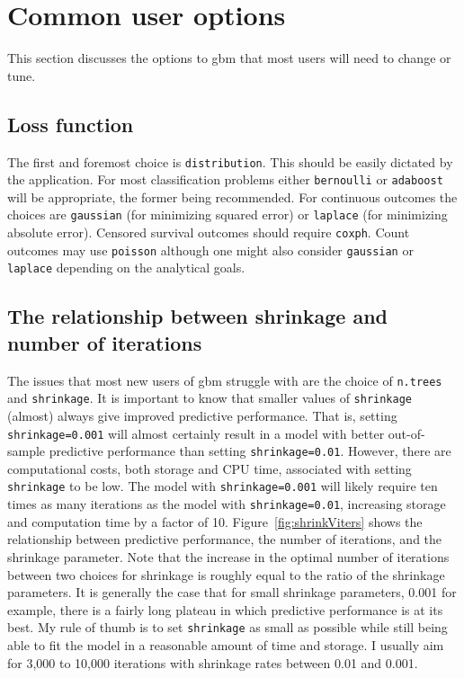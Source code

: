 \documentclass{article}
\begin{document}
\section{Common user options}

This section discusses the options to gbm that most users will need to change or tune.

\subsection{Loss function}
The first and foremost choice is \texttt{distribution}. This should be easily dictated by the application. For most classification problems either \texttt{bernoulli} or \texttt{adaboost} will be appropriate, the former being recommended. For continuous outcomes the choices are \texttt{gaussian} (for minimizing squared error) or \texttt{laplace} (for minimizing absolute error). Censored survival outcomes should require \texttt{coxph}. Count outcomes may use \texttt{poisson} although one might also consider \texttt{gaussian} or \texttt{laplace} depending on the analytical goals.

\subsection{The relationship between shrinkage and number of iterations}
The issues that most new users of gbm struggle with are the choice of \texttt{n.trees} and \texttt{shrinkage}. It is important to know that smaller values of \texttt{shrinkage} (almost) always give improved predictive performance. That is, setting \texttt{shrinkage=0.001} will almost certainly result in a model with better out-of-sample predictive performance than setting \texttt{shrinkage=0.01}. However, there are computational costs, both storage and CPU time, associated with setting \texttt{shrinkage} to be low. The model with \texttt{shrinkage=0.001} will likely require ten times as many iterations as the model with \texttt{shrinkage=0.01}, increasing storage and computation time by a factor of 10. Figure~\ref{fig:shrinkViters} shows the relationship between predictive performance, the number of iterations, and the shrinkage parameter. Note that the increase in the optimal number of iterations between two choices for shrinkage is roughly equal to the ratio of the shrinkage parameters. It is generally the case that for small shrinkage parameters, 0.001 for example, there is a fairly long plateau in which predictive performance is at its best. My rule of thumb is to set \texttt{shrinkage} as small as possible while still being able to fit the model in a reasonable amount of time and storage. I usually aim for 3,000 to 10,000 iterations with shrinkage rates between 0.01 and 0.001.
\end{document}
